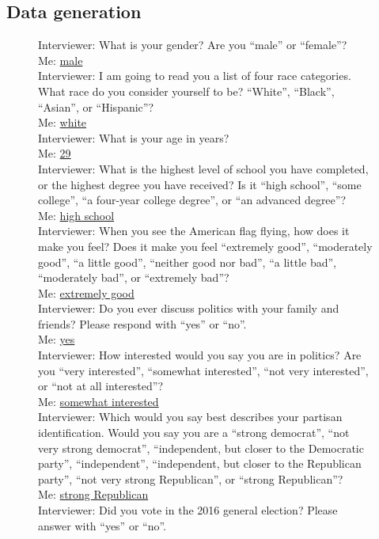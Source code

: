 \documentclass[11pt]{article}
\begin{document}
\subsection{Data generation}
\begin{figure}
\begin{mdframed}
{\small{Interviewer: What is your gender? Are you ``male'' or ``female''?\\
Me: \underline{male}\\
Interviewer: I am going to read you a list of four race categories. What race do you consider yourself to be? ``White'', ``Black'', ``Asian'', or ``Hispanic''?\\
Me: \underline{white}\\
Interviewer: What is your age in years?\\
Me: \underline{29}\\
Interviewer: What is the highest level of school you have completed, or the highest degree you have received? Is it ``high school'', ``some college'', ``a four-year college degree'', or ``an advanced degree''?\\
Me: \underline{high school}\\
Interviewer:  When you see the American flag flying, how does it make you feel? Does it make you feel ``extremely good'', ``moderately good'', ``a little good'', ``neither good nor bad'', ``a little bad'', ``moderately bad'', or ``extremely bad''?\\
Me: \underline{extremely good}\\
Interviewer: Do you ever discuss politics with your family and friends? Please respond with ``yes'' or ``no''.\\
Me: \underline{yes}\\
Interviewer: How interested would you say you are in politics? Are you ``very interested'', ``somewhat interested'', ``not very interested'', or ``not at all interested''?\\
Me: \underline{somewhat interested}\\
Interviewer: Which would you say best describes your partisan identification. Would you say you are a ``strong democrat'', ``not very strong democrat'', ``independent, but closer to the Democratic party'', ``independent'', ``independent, but closer to the Republican party'', ``not very strong Republican'', or ``strong Republican''?\\
Me: \underline{strong Republican}\\
Interviewer: Did you vote in the 2016 general election? Please answer with ``yes'' or ``no''.\\
}}
\end{mdframed}
\end{figure}
\end{document}
